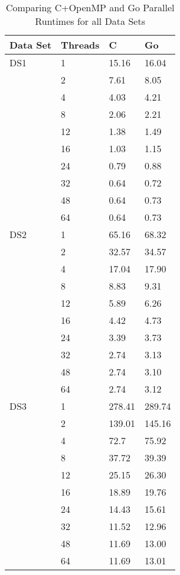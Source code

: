 \documentclass[11pt,a4paper,titlepage]{article}
\begin{document}
\begin{table}[!h]
\centering
\begin{tabular}{|l|l|l|l|}
\hline
Data Set & Threads & C & Go \\ \hline
DS1 & 1 & 15.16 & 16.04 \\ \cline{2-4} 
 & 2 & 7.61 & 8.05 \\ \cline{2-4} 
 & 4 & 4.03 & 4.21 \\ \cline{2-4} 
 & 8 & 2.06 & 2.21 \\ \cline{2-4} 
 & 12 & 1.38 & 1.49 \\ \cline{2-4} 
 & 16 & 1.03 & 1.15 \\ \cline{2-4} 
 & 24 & 0.79 & 0.88 \\ \cline{2-4} 
 & 32 & 0.64 & 0.72 \\ \cline{2-4} 
 & 48 & 0.64 & 0.73 \\ \cline{2-4} 
 & 64 & 0.64 & 0.73 \\ \hline
DS2 & 1 & 65.16 & 68.32 \\ \cline{2-4} 
 & 2 & 32.57 & 34.57 \\ \cline{2-4} 
 & 4 & 17.04 & 17.90 \\ \cline{2-4} 
 & 8 & 8.83 & 9.31 \\ \cline{2-4} 
 & 12 & 5.89 & 6.26 \\ \cline{2-4} 
 & 16 & 4.42 & 4.73 \\ \cline{2-4} 
 & 24 & 3.39 & 3.73 \\ \cline{2-4} 
 & 32 & 2.74 & 3.13 \\ \cline{2-4} 
 & 48 & 2.74 & 3.10 \\ \cline{2-4} 
 & 64 & 2.74 & 3.12 \\ \hline
DS3 & 1 & 278.41 & 289.74 \\ \cline{2-4} 
 & 2 & 139.01 & 145.16 \\ \cline{2-4} 
 & 4 & 72.7 & 75.92 \\ \cline{2-4} 
 & 8 & 37.72 & 39.39 \\ \cline{2-4} 
 & 12 & 25.15 & 26.30 \\ \cline{2-4} 
 & 16 & 18.89 & 19.76 \\ \cline{2-4} 
 & 24 & 14.43 & 15.61 \\ \cline{2-4} 
 & 32 & 11.52 & 12.96 \\ \cline{2-4} 
 & 48 & 11.69 & 13.00 \\ \cline{2-4} 
 & 64 & 11.69 & 13.01 \\ \hline
\end{tabular}
\caption{Comparing C+OpenMP and Go Parallel Runtimes for all Data Sets}
\end{table}
\end{document}
